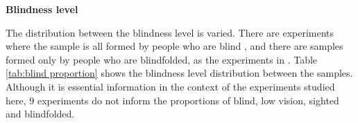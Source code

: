 \textbf{Blindness level}


The distribution between the blindness level is varied. There are experiments where the sample is all formed by people who are blind \cite{Lahav2012,Sanchez2005c}, and there are samples formed only by people who are blindfolded, as the experiments in \cite{Pissaloux2017TowardsDevices}. Table \ref{tab:blind proportion} shows the blindness level distribution between the samples. Although it is essential information in the context of the experiments studied here, 9 experiments do not inform the proportions of blind, low vision, sighted and blindfolded. 


